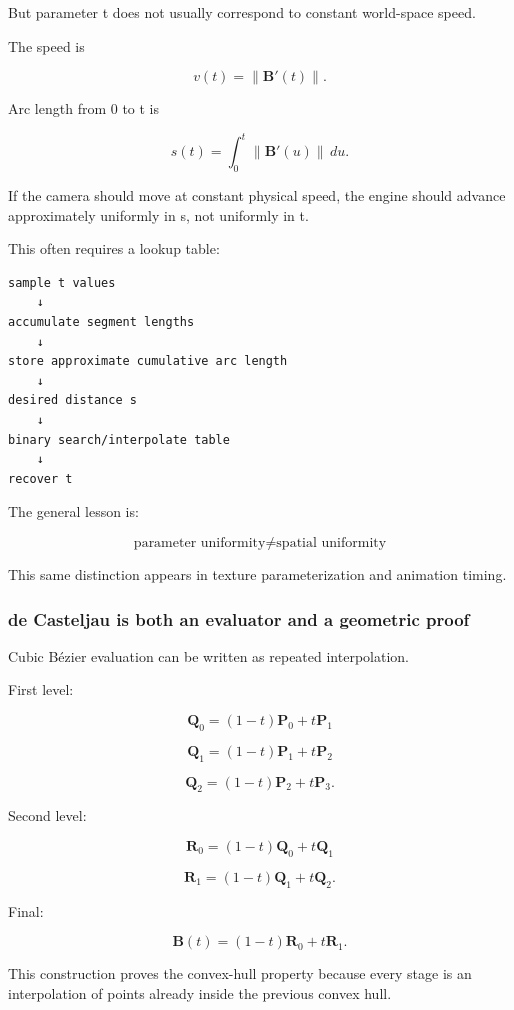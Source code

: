 But parameter t does not usually correspond to constant world-space speed.

The speed is

\[
v(t)=\|\mathbf B'(t)\|.
\]

Arc length from 0 to t is

\[
s(t)=\int_0^t\|\mathbf B'(u)\|\,du.
\]

If the camera should move at constant physical speed, the engine should advance approximately uniformly in s, not uniformly in t.

This often requires a lookup table:

\begin{verbatim}
sample t values
    ↓
accumulate segment lengths
    ↓
store approximate cumulative arc length
    ↓
desired distance s
    ↓
binary search/interpolate table
    ↓
recover t
\end{verbatim}

The general lesson is:

\[
\boxed{
\text{parameter uniformity}
\neq
\text{spatial uniformity}
}
\]

This same distinction appears in texture parameterization and animation timing.

\subsubsection{de Casteljau is both an evaluator and a geometric proof}\label{03-visual-computing-i-ch001-de-casteljau-is-both-an-evaluator-and-a-geometric-proof}

Cubic Bézier evaluation can be written as repeated interpolation.

First level:

\[
\mathbf Q_0=(1-t)\mathbf P_0+t\mathbf P_1
\]

\[
\mathbf Q_1=(1-t)\mathbf P_1+t\mathbf P_2
\]

\[
\mathbf Q_2=(1-t)\mathbf P_2+t\mathbf P_3.
\]

Second level:

\[
\mathbf R_0=(1-t)\mathbf Q_0+t\mathbf Q_1
\]

\[
\mathbf R_1=(1-t)\mathbf Q_1+t\mathbf Q_2.
\]

Final:

\[
\mathbf B(t)=(1-t)\mathbf R_0+t\mathbf R_1.
\]

This construction proves the convex-hull property because every stage is an interpolation of points already inside the previous convex hull.

